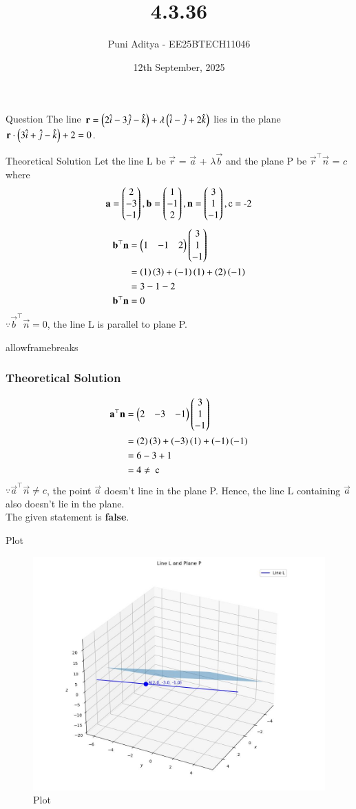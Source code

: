 \documentclass{beamer}
\title{4.3.36}
\date{12th September, 2025}
\author{Puni Aditya - EE25BTECH11046}
\begin{document}
\frame{\titlepage}
\begin{frame}{Question}
The line $\mathbf{r} = \left(2\hat{i} - 3\hat{j} - \hat{k}\right) + \lambda\left(\hat{i} - \hat{j} + 2\hat{k}\right)$ lies in the plane $\mathbf{r} \cdot \left(3\hat{i} + \hat{j} - \hat{k}\right) + 2 = 0$.
\end{frame}

\begin{frame}{Theoretical Solution}
Let the line L be $\vec{r}$ = $\vec{a}$ + $\lambda\vec{b}$ and the plane P be $\vec{r}^\top\vec{n}$ = $c$ where
\begin{align*}
    \mathbf{a} = \begin{pmatrix}2 \\ -3 \\ -1\end{pmatrix}, \mathbf{b} = \begin{pmatrix}1 \\ -1 \\ 2\end{pmatrix}, \mathbf{n} = \begin{pmatrix}3 \\ 1 \\ -1\end{pmatrix}, \text{c = -2}
\end{align*}
\begin{align}
    \mathbf{b}^\top\mathbf{n} &= \begin{pmatrix}1 & -1 & 2\end{pmatrix}\begin{pmatrix}3 \\ 1 \\ -1\end{pmatrix} \\
    &= \left(1\right)\left(3\right)+\left(-1\right)\left(1\right)+\left(2\right)\left(-1\right) \\
    &= 3-1-2 \\
    \mathbf{b}^\top\mathbf{n} &= 0
\end{align}
$\because \vec{b}^\top\vec{n} = 0$, the line L is parallel to plane P.
\end{frame}

\begin{frame}{allowframebreaks}
\frametitle{Theoretical Solution}
\begin{align}
    \mathbf{a}^\top\mathbf{n} &= \begin{pmatrix}2 & -3 & -1\end{pmatrix}\begin{pmatrix}3 \\ 1 \\ -1\end{pmatrix} \\
    &= \left(2\right)\left(3\right) + \left(-3\right)\left(1\right) + \left(-1\right)\left(-1\right) \\
    &= 6-3+1 \\
    &= 4 \neq \text{ c}
\end{align}
$\because \vec{a}^\top\vec{n} \neq c$, the point $\vec{a}$ doesn't line in the plane P. Hence, the line L containing $\vec{a}$ also doesn't lie in the plane. \\
The given statement is \textbf{false}.
\end{frame}

\begin{frame}{Plot}
    \begin{figure}
        \centering
        \includegraphics[width=0.7\columnwidth]{../figs/plot_c.jpg}
        \caption{Plot}
        \label{fig:fig}
    \end{figure}
\end{frame}
\end{document}
